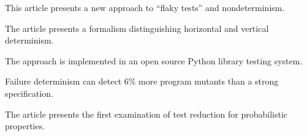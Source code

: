 \documentclass{article}
\begin{document}

\vspace{0.1in}


\vspace{0.1in}

\noindent This article presents a new approach to ``flaky tests'' and nondeterminism.

\vspace{0.1in}

\noindent The article presents a formalism distinguishing horizontal and vertical determinism.

\vspace{0.1in}

\noindent The approach is implemented in an open source Python library testing system.

\vspace{0.1in}

\noindent Failure determinism can detect 6\% more program mutants than a strong specification.

\vspace{0.1in}

\noindent The article presents the first examination of test reduction for probabilistic properties.
\end{document}
